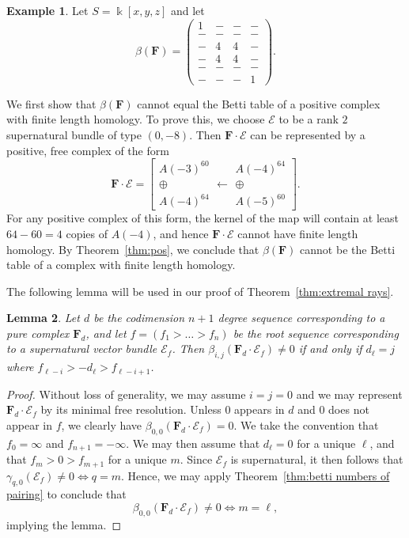 \documentclass[12pt]{amsart}
\newtheorem{lemma}{Lemma}[section]
\theoremstyle{definition}
\newtheorem{example}[lemma]{Example}
\theoremstyle{remark}
\newcommand{\kk}{\Bbbk}
\newcommand{\cE}{\mathcal{E}}
\newcommand{\FF}{\mathbf{F}}
\begin{document}
\begin{example}\label{ex:1441}
Let $S=\kk[x,y,z]$ and let
\begin{equation}\label{eqn:intro ex}
\beta(\FF)=\begin{pmatrix} 1&-&-&-\\ -&-&-&-\\-&4&4&-\\-&4&4&-\\-&-&-&-\\-&-&-&1 \end{pmatrix}.
\end{equation}


We first show that $\beta(\FF)$ cannot equal the Betti table of a positive complex with finite length homology.  To prove this, we choose $\cE$ to be a rank $2$ supernatural bundle of type $(0,-8)$.  Then $\FF\cdot \cE$ can be represented by a positive, free complex of the form
\[
\FF\cdot \cE=\left[ \begin{matrix}A(-3)^{60}\\ \oplus \\A(-4)^{64}\end{matrix} \longleftarrow \begin{matrix}A(-4)^{64}\\\oplus \\ A(-5)^{60}\end{matrix}\right].
\]
For any positive complex of this form, the kernel of the map will contain at least $64-60=4$ copies of $A(-4)$, and hence $\FF\cdot \cE$ cannot have finite length homology.  By Theorem~\ref{thm:pos}, we conclude that $\beta(\FF)$ cannot be the Betti table of a complex with finite length homology.
\end{example}


The following lemma will be used in our proof of Theorem~\ref{thm:extremal rays}.
\begin{lemma}\label{lem:pure and supernatural}
Let $d$ be the codimension $n+1$ degree sequence corresponding to a pure complex $\FF_d$, and let $f=(f_1>\dots >f_n)$ be the root sequence corresponding to a supernatural vector bundle $\cE_f$.  Then
$
\beta_{i,j}(\FF_d\cdot \cE_f)\ne 0
$
if and only if $d_\ell=j$ where $f_{\ell-i}>-d_{\ell}>f_{\ell-i+1}$.\end{lemma}
\begin{proof}
Without loss of generality, we may assume $i=j=0$ and we may represent $\FF_d\cdot \cE_f$ by its minimal free resolution. Unless $0$ appears in $d$ and $0$ does not appear in $f$, we clearly have $\beta_{0,0}(\FF_d\cdot \cE_f)=0$.  We take the convention that $f_0=\infty$ and $f_{n+1}=-\infty$. We may then assume that $d_{\ell}=0$ for a unique $\ell$, and that $f_m>0>f_{m+1}$ for a unique $m$.
Since $\cE_f$ is supernatural, it then follows that $\gamma_{q,0}(\cE_f)\ne 0 \iff q=m$.  Hence, we may apply Theorem~\ref{thm:betti numbers of pairing} to conclude that
\[
\beta_{0,0}(\FF_d\cdot \cE_f)\ne 0 \iff m=\ell,
\]
implying the lemma.
\end{proof}
\end{document}
